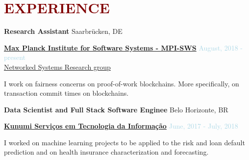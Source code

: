 

\section*{\textcolor{maroon}{\normalsize EXPERIENCE}}


\textbf{Research Assistant} \hfill {Saarbrücken, DE}
\begin{outerlist}

\item[] \href{https://www.mpi-sws.org}{\textbf{Max Planck Institute for Software Systems - MPI-SWS}}  \hfill {\textcolor{lightblue}{August, 2018 - present}}
\\ \href{https://www.mpi-sws.org/research-areas/social-and-information-systems/}{Networked Systems Research group}  \medskip 

        \begin{innerlist}[-]
        \item I work on fairness concerns on proof-of-work blockchains. More specifically, on transaction commit times on blockchains.     
        \end{innerlist}

\end{outerlist}

\medskip

\textbf{Data Scientist and Full Stack Software Enginee} \hfill {Belo Horizonte, BR}
\begin{outerlist}

\item[] \href{https://kunumi.com}{\textbf{Kunumi Serviços em Tecnologia da Informação}}  \hfill {\textcolor{lightblue}{June, 2017 - July, 2018}} \medskip 

        \begin{innerlist}[-]
        \item I worked on machine learning projects to be applied to the risk and loan default prediction and on health insurance characterization and forecasting.  
        \end{innerlist}

\end{outerlist}

\medskip



